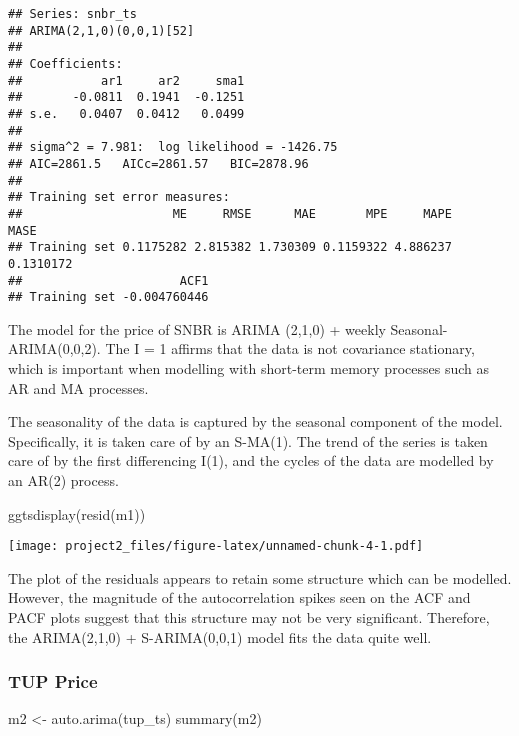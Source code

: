\documentclass[
  10.5pt,
]{article}
\newenvironment{Shaded}{\begin{snugshade}}{\end{snugshade}}
\newcommand{\FunctionTok}[1]{\textcolor[rgb]{0.00,0.00,0.00}{#1}}
\newcommand{\NormalTok}[1]{#1}
\newcommand{\OtherTok}[1]{\textcolor[rgb]{0.56,0.35,0.01}{#1}}
\begin{document}
\begin{verbatim}
## Series: snbr_ts 
## ARIMA(2,1,0)(0,0,1)[52] 
## 
## Coefficients:
##           ar1     ar2     sma1
##       -0.0811  0.1941  -0.1251
## s.e.   0.0407  0.0412   0.0499
## 
## sigma^2 = 7.981:  log likelihood = -1426.75
## AIC=2861.5   AICc=2861.57   BIC=2878.96
## 
## Training set error measures:
##                     ME     RMSE      MAE       MPE     MAPE      MASE
## Training set 0.1175282 2.815382 1.730309 0.1159322 4.886237 0.1310172
##                      ACF1
## Training set -0.004760446
\end{verbatim}

The model for the price of SNBR is ARIMA (2,1,0) + weekly
Seasonal-ARIMA(0,0,2). The I = 1 affirms that the data is not covariance
stationary, which is important when modelling with short-term memory
processes such as AR and MA processes.

The seasonality of the data is captured by the seasonal component of the
model. Specifically, it is taken care of by an S-MA(1). The trend of the
series is taken care of by the first differencing I(1), and the cycles
of the data are modelled by an AR(2) process.

\begin{Shaded}
\begin{Highlighting}[]
\FunctionTok{ggtsdisplay}\NormalTok{(}\FunctionTok{resid}\NormalTok{(m1))}
\end{Highlighting}
\end{Shaded}

\texttt{[image: project2\_files/figure-latex/unnamed-chunk-4-1.pdf]}

The plot of the residuals appears to retain some structure which can be
modelled. However, the magnitude of the autocorrelation spikes seen on
the ACF and PACF plots suggest that this structure may not be very
significant. Therefore, the ARIMA(2,1,0) + S-ARIMA(0,0,1) model fits the
data quite well.

\hypertarget{tup-price}{%
\subsubsection{TUP Price}\label{tup-price}}

\begin{Shaded}
\begin{Highlighting}[]
\NormalTok{m2 }\OtherTok{\textless{}{-}} \FunctionTok{auto.arima}\NormalTok{(tup\_ts)}
\FunctionTok{summary}\NormalTok{(m2)}
\end{Highlighting}
\end{Shaded}
\end{document}
